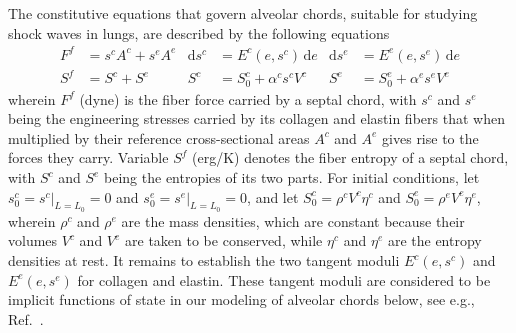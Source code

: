 The constitutive equations that govern alveolar chords, suitable for studying shock waves in lungs, are described by the following equations
\begin{subequations}
    \label{septalChordCEs}
    \begin{align}
    F^f & = s^c A^c + s^e A^e &
    \mathrm{d} s^c & = E^c ( e, s^c ) \, \mathrm{d}e & 
    \mathrm{d} s^e & = E^e ( e, s^e ) \, \mathrm{d}e \\
    S^f & = S^c + S^e & 
    S^c & = S_0^c + \alpha^c s^c V^c & 
    S^e & = S_0^e + \alpha^e s^e V^e
    \end{align}
\end{subequations}  
wherein $F^f$ (dyne) is the fiber force carried by a septal chord, with $s^c$ and $s^e$ being the engineering stresses carried by its collagen and elastin fibers that when multiplied by their reference cross-sectional areas $A^c$ and $A^e$ gives rise to the forces they carry.  Variable $S^f$ (erg/K) denotes the fiber entropy of a septal chord, with $S^c$ and $S^e$ being the entropies of its two parts.  For initial conditions, let $s^c_0 = s^c |_{L = L_0} = 0$ and $s^e_0 = s^e |_{L = L_0} = 0$, and let $S_0^c = \rho^c V^c \eta^c$ and $S_0^e = \rho^e V^e \eta^e$, wherein $\rho^c$ and $\rho^e$ are the mass densities, which are constant because their volumes $V^c$ and $V^e$ are taken to be conserved, while $\eta^c$ and $\eta^e$ are the entropy densities at rest.  It remains to establish the two tangent moduli $E^c (e, s^c)$ and $E^e (e, s^e)$ for collagen and elastin.  These tangent moduli are considered to be implicit functions of state in our modeling of alveolar chords below, see e.g., Ref.~\cite{FreedRajagopal16}.

